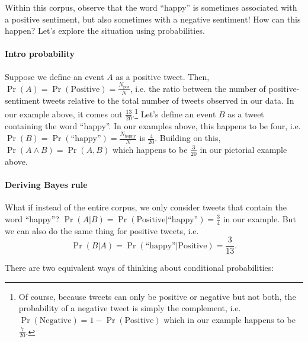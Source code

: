 \documentclass[12pt]{article}
\begin{document}
Within this corpus, observe that the word ``happy'' is sometimes associated with a positive sentiment, but also sometimes with a negative sentiment! How can this happen? Let's explore the situation using probabilities.

\paragraph{Intro probability} Suppose we define an event $A$ as a positive tweet. Then, $\Pr(A) = \Pr(\textrm{Positive}) = \frac{N_{\textrm{pos}}}{N}$, i.e. the ratio between the number of positive-sentiment tweets relative to the total number of tweets observed in our data. In our example above, it comes out $\frac{13}{20}$.\footnote{Of course, because tweets can only be positive or negative but not both, the probability of a negative tweet is simply the complement, i.e. $\Pr(\textrm{Negative}) = 1 - \Pr(\textrm{Positive})$ which in our example happens to be $\frac{7}{20}$.} Let's define an event $B$ as a tweet containing the word ``happy''. In our examples above, this happens to be four, i.e. $\Pr(B) = \Pr(\textrm{``happy''}) = \frac{N_{\textrm{happy}}}{N}$ is $\frac{4}{20}$. Building on this, $\Pr(A \land B) = \Pr(A,B)$ which happens to be $\frac{3}{20}$ in our pictorial example above.

\paragraph{Deriving Bayes rule} What if instead of the entire corpus, we only consider tweets that contain the word ``happy''? $\Pr(A|B) = \Pr(\textrm{Positive} | \textrm{``happy''}) = \frac{3}{4}$ in our example. But we can also do the same thing for positive tweets, i.e.
\[
  \Pr(B|A) = \Pr(\textrm{``happy''} | \textrm{Positive}) = \frac{3}{13}.
\]

There are two equivalent ways of thinking about conditional probabilities:
\begin{figure}[h]
  \begin{center}
  \end{center}
\end{figure}
\end{document}
